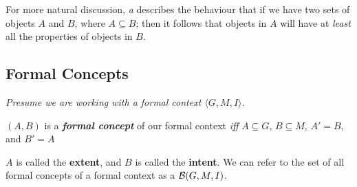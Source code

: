 For more natural discussion, \textit{a} describes the behaviour that if we have two sets of objects $A$ and $B$, where $A \subseteq B$; then it follows that objects in $A$ will have at \textit{least} all the properties of objects in $B$. 

\subsection{Formal Concepts}
\label{sec:Introduction-Formal_Concepts}

\textit{Presume we are working with a formal context $\langle G, M, I \rangle$.}
\begin{definition}
    
    $(A,B)$ is a \textit{\textbf{formal concept}} of our formal context \textit{iff}    $A \subseteq G$, $B \subseteq M$, $A' = B$, and $B' = A$ 
\end{definition}

$A$ is called the \textbf{extent}, and $B$ is called the \textbf{intent}. We can refer to the set of all formal concepts of a formal context as a $\mathcal{B} (G, M, I)$.